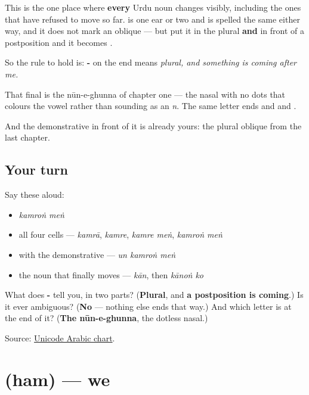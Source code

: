 \begin{grammarlens}[title={Grammar Lens: the ending that catches every noun}]
This is the one place where \textbf{every} Urdu noun changes visibly, including the ones that have refused to move so far. \textbf{} is one ear or two and is spelled the same either way, and it does not mark an oblique — but put it in the plural \textbf{and} in front of a postposition and it becomes \textbf{}.

So the rule to hold is: \textbf{-} on the end means \emph{plural, and something is coming after me.}

That final \textbf{} is the nūn-e-ghunna of chapter one — the nasal with no dots that colours the vowel rather than sounding as an \emph{n}. The same letter ends \textbf{} and \textbf{} and \textbf{}.

And the demonstrative in front of it is already yours: the plural oblique \textbf{} from the last chapter.
\end{grammarlens}

\subsection*{Your turn}
Say these aloud:

\begin{itemize}
\raggedright
  \item \emph{kamroṅ meṅ}
  \item all four cells — \emph{kamrā}, \emph{kamre}, \emph{kamre meṅ}, \emph{kamroṅ meṅ}
  \item with the demonstrative — \emph{un kamroṅ meṅ}
  \item the noun that finally moves — \emph{kān}, then \emph{kānoṅ ko}
\end{itemize}

\begin{tcolorbox}[breakable,colback=teal!4,colframe=teal!35!black,title={Before you move on}]
What does \textbf{-} tell you, in two parts? (\textbf{Plural}, and \textbf{a postposition is coming}.) Is it ever ambiguous? (\textbf{No} — nothing else ends that way.) And which letter is at the end of it? (\textbf{The nūn-e-ghunna}, the dotless nasal.)

Source: \href{https://www.unicode.org/charts/PDF/U0600.pdf}{Unicode Arabic chart}.
\end{tcolorbox}
\section[\texorpdfstring{\ur{ہم} (ham)}{ہم (ham)}]{ (ham) — we}


